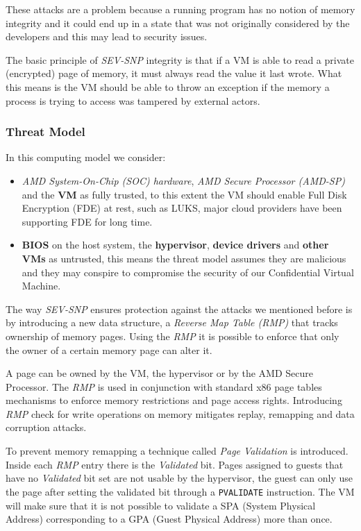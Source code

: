 \documentclass[twocolumn]{article}
\begin{document}
These attacks are a problem because a running program has no notion of memory integrity and it could end up in a state that was not originally considered by the developers and this may lead to security issues.

The basic principle of \textit{SEV-SNP} integrity is that if a VM is able to read a private (encrypted) page of memory, it must always read the value it last wrote. What this means is the VM should be able to throw an exception if the memory a process is trying to access was tampered by external actors.

\subsubsection{Threat Model}
In this computing model we consider:
\begin{itemize}
    \item \textit{AMD System-On-Chip (SOC) hardware}, \textit{AMD Secure Processor (AMD-SP)} and the \textbf{VM} as fully trusted, to this extent the VM should enable Full Disk Encryption (FDE) at rest, such as LUKS, major cloud providers have been supporting FDE for long time.
    \item \textbf{BIOS} on the host system, the \textbf{hypervisor}, \textbf{device drivers} and \textbf{other VMs} as untrusted, this means the threat model assumes they are malicious and they may conspire to compromise the security of our Confidential Virtual Machine.
\end{itemize}

The way \textit{SEV-SNP} ensures protection against the attacks we mentioned before is by introducing a new data structure, a \textit{Reverse Map Table (RMP)} that tracks ownership of memory pages. Using the \textit{RMP} it is possible to enforce that only the owner of a certain memory page can alter it.

A page can be owned by the VM, the hypervisor or by the AMD Secure Processor. The \textit{RMP} is used in conjunction with standard x86 page tables mechanisms to enforce memory restrictions and page access rights. Introducing \textit{RMP} check for write operations on memory mitigates replay, remapping and data corruption attacks. 

To prevent memory remapping a technique called \textit{Page Validation} is introduced. Inside each \textit{RMP} entry there is the \textit{Validated} bit. Pages assigned to guests that have no \textit{Validated} bit set are not usable by the hypervisor, the guest can only use the page after setting the validated bit through a \texttt{PVALIDATE} instruction. The VM will make sure that it is not possible to validate a SPA (System Physical Address) corresponding to a GPA (Guest Physical Address) more than once.
 
\end{document}
